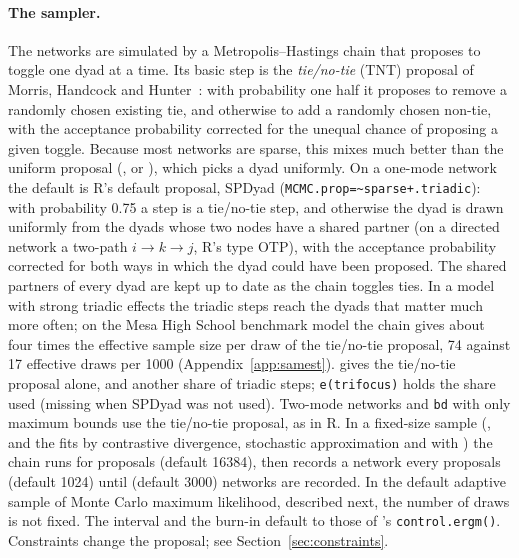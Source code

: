 \paragraph{The sampler.} The networks are simulated by a Metropolis--Hastings chain that proposes to toggle one dyad at a time. Its basic step is the \emph{tie/no-tie} (TNT) proposal of Morris, Handcock and Hunter~\cite{morris2008}: with probability one half it proposes to remove a randomly chosen existing tie, and otherwise to add a randomly chosen non-tie, with the acceptance probability corrected for the unequal chance of proposing a given toggle. Because most networks are sparse, this mixes much better than the uniform proposal (, or ), which picks a dyad uniformly. On a one-mode network the default is R's default proposal, SPDyad (\texttt{MCMC.prop=\textasciitilde sparse+.triadic}): with probability 0.75 a step is a tie/no-tie step, and otherwise the dyad is drawn uniformly from the dyads whose two nodes have a shared partner (on a directed network a two-path $i\to k\to j$, R's type OTP), with the acceptance probability corrected for both ways in which the dyad could have been proposed. The shared partners of every dyad are kept up to date as the chain toggles ties. In a model with strong triadic effects the triadic steps reach the dyads that matter much more often; on the Mesa High School benchmark model the chain gives about four times the effective sample size per draw of the tie/no-tie proposal, 74 against 17 effective draws per 1000 (Appendix~\ref{app:samest}).  gives the tie/no-tie proposal alone, and  another share of triadic steps; \texttt{e(trifocus)} holds the share used (missing when SPDyad was not used). Two-mode networks and \texttt{bd} with only maximum bounds use the tie/no-tie proposal, as in R. In a fixed-size sample (, and the fits by contrastive divergence, stochastic approximation and with ) the chain runs for  proposals (default 16384), then records a network every  proposals (default 1024) until  (default 3000) networks are recorded. In the default adaptive sample of Monte Carlo maximum likelihood, described next, the number of draws is not fixed. The interval and the burn-in default to those of \ergm{}'s \texttt{control.ergm()}. Constraints change the proposal; see Section~\ref{sec:constraints}.

